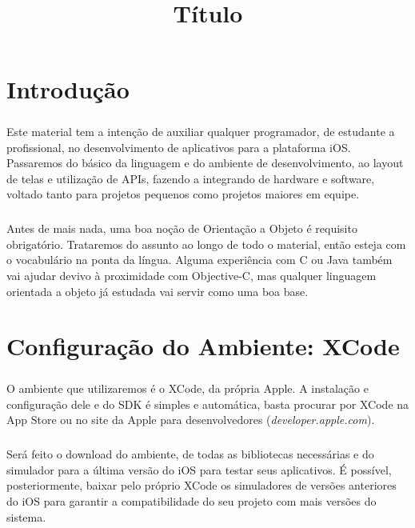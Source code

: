 \documentclass[a4paper,12pt,brazil,doubleside]{book}
\title{Título}
\begin{document}

\cleardoublepage

\onehalfspace

\pagestyle{plain}

\setcounter{tocdepth}{1} %
\tableofcontents


\lstset{language=[Objective]C}



\chapter{Introdução}

\paragraph{}Este material tem a intenção de auxiliar qualquer programador, de estudante a profissional, no desenvolvimento de aplicativos para a plataforma iOS. Passaremos do básico da linguagem e do ambiente de desenvolvimento, ao layout de telas e utilização de APIs, fazendo a integrando de hardware e software, voltado tanto para projetos pequenos como projetos maiores em equipe.
\paragraph{}Antes de mais nada, uma boa noção de Orientação a Objeto é requisito obrigatório. Trataremos do assunto ao longo de todo o material, então esteja com o vocabulário na ponta da língua. Alguma experiência com C ou Java também vai ajudar devivo à proximidade com Objective-C, mas qualquer linguagem orientada a objeto já estudada vai servir como uma boa base.



\chapter{Configuração do Ambiente: XCode}

\paragraph{}O ambiente que utilizaremos é o XCode, da própria Apple. A instalação e configuração dele e do SDK é simples e automática, basta procurar por XCode na App Store ou no site da Apple para desenvolvedores (\textit{developer.apple.com}).
\paragraph{}Será feito o download do ambiente, de todas as bibliotecas necessárias e do simulador para a última versão do iOS para testar seus aplicativos. É possível, posteriormente, baixar pelo próprio XCode os simuladores de versões anteriores do iOS para garantir a compatibilidade do seu projeto com mais versões do sistema.
\end{document}
